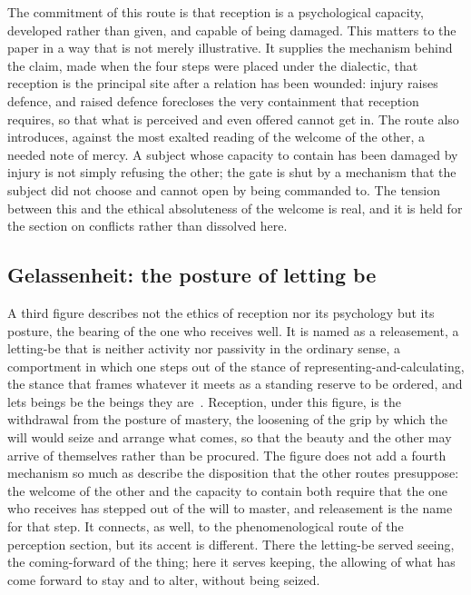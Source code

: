 The commitment of this route is that reception is a psychological capacity, developed rather than given, and capable of being damaged. This matters to the paper in a way that is not merely illustrative. It supplies the mechanism behind the claim, made when the four steps were placed under the dialectic, that reception is the principal site after a relation has been wounded: injury raises defence, and raised defence forecloses the very containment that reception requires, so that what is perceived and even offered cannot get in. The route also introduces, against the most exalted reading of the welcome of the other, a needed note of mercy. A subject whose capacity to contain has been damaged by injury is not simply refusing the other; the gate is shut by a mechanism that the subject did not choose and cannot open by being commanded to. The tension between this and the ethical absoluteness of the welcome is real, and it is held for the section on conflicts rather than dissolved here.

\subsection{Gelassenheit: the posture of letting be}
\label{p22:sub:reception-gelassenheit}

A third figure describes not the ethics of reception nor its psychology but its posture, the bearing of the one who receives well. It is named as a releasement, a letting-be that is neither activity nor passivity in the ordinary sense, a comportment in which one steps out of the stance of representing-and-calculating, the stance that frames whatever it meets as a standing reserve to be ordered, and lets beings be the beings they are~\parencite{heidegger_gelassenheit}. Reception, under this figure, is the withdrawal from the posture of mastery, the loosening of the grip by which the will would seize and arrange what comes, so that the beauty and the other may arrive of themselves rather than be procured. The figure does not add a fourth mechanism so much as describe the disposition that the other routes presuppose: the welcome of the other and the capacity to contain both require that the one who receives has stepped out of the will to master, and releasement is the name for that step. It connects, as well, to the phenomenological route of the perception section, but its accent is different. There the letting-be served seeing, the coming-forward of the thing; here it serves keeping, the allowing of what has come forward to stay and to alter, without being seized.

